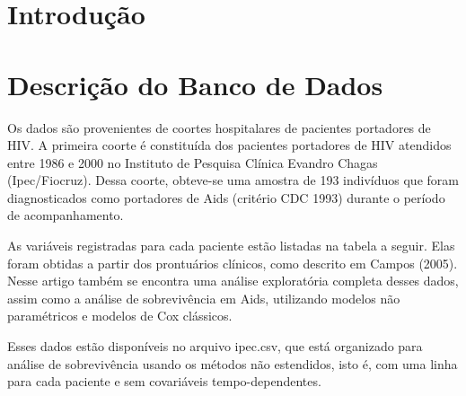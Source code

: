 \documentclass[a4paper, oneside]{book}\usepackage[]{graphicx}\usepackage[]{color}
\begin{document}




\tableofcontents 	


\listoffigures %






  \chapter{Introdução}
  



  \chapter{Descrição do Banco de Dados}
  
Os dados são provenientes de coortes hospitalares de pacientes portadores de HIV. A primeira coorte é constituída dos pacientes portadores de HIV atendidos entre 1986 e 2000 no Instituto de Pesquisa Clínica Evandro Chagas (Ipec/Fiocruz). Dessa coorte, obteve-se uma amostra de 193 indivíduos que foram diagnosticados como portadores de Aids (critério CDC 1993) durante o período de acompanhamento.

As variáveis registradas para cada paciente estão listadas na tabela a seguir. Elas foram obtidas a partir dos prontuários clínicos, como descrito em Campos (2005). Nesse artigo também se encontra uma análise exploratória completa desses dados, assim como a análise de sobrevivência em Aids, utilizando modelos não paramétricos e modelos de Cox clássicos.

Esses dados estão disponíveis no arquivo ipec.csv, que está organizado para análise de sobrevivência usando os métodos não estendidos, isto é, com uma linha para cada paciente e sem covariáveis tempo-dependentes. 
\end{document}
